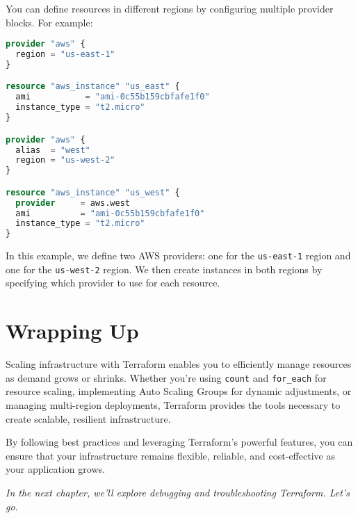 You can define resources in different regions by configuring multiple provider blocks. For example:

\begin{lstlisting}[language=terraform]
provider "aws" {
  region = "us-east-1"
}

resource "aws_instance" "us_east" {
  ami           = "ami-0c55b159cbfafe1f0"
  instance_type = "t2.micro"
}

provider "aws" {
  alias  = "west"
  region = "us-west-2"
}

resource "aws_instance" "us_west" {
  provider     = aws.west
  ami          = "ami-0c55b159cbfafe1f0"
  instance_type = "t2.micro"
}
\end{lstlisting}

In this example, we define two AWS providers: one for the \texttt{us-east-1} region and one for the \texttt{us-west-2} region. We then create instances in both regions by specifying which provider to use for each resource.

\section{Wrapping Up}

Scaling infrastructure with Terraform enables you to efficiently manage resources as demand grows or shrinks. Whether you're using \texttt{count} and \texttt{for\_each} for resource scaling, implementing Auto Scaling Groups for dynamic adjustments, or managing multi-region deployments, Terraform provides the tools necessary to create scalable, resilient infrastructure.

By following best practices and leveraging Terraform's powerful features, you can ensure that your infrastructure remains flexible, reliable, and cost-effective as your application grows.

\vspace{1em}

\textit{In the next chapter, we'll explore debugging and troubleshooting Terraform. Let's go.}
